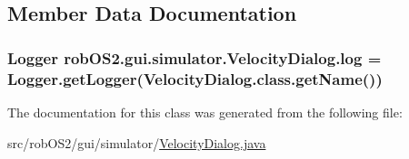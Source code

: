 \subsection{Member Data Documentation}
\hypertarget{classrob_o_s2_1_1gui_1_1simulator_1_1_velocity_dialog_ad96ed4d3960dc2b25370a9d4f284c660}{
\subsubsection[{log}]{\setlength{\rightskip}{0pt plus 5cm}Logger {\bf robOS2.gui.simulator.VelocityDialog.log} = Logger.getLogger(VelocityDialog.class.getName())}}
\label{classrob_o_s2_1_1gui_1_1simulator_1_1_velocity_dialog_ad96ed4d3960dc2b25370a9d4f284c660}


The documentation for this class was generated from the following file:\begin{DoxyCompactItemize}
\item 
src/robOS2/gui/simulator/\hyperlink{_velocity_dialog_8java}{VelocityDialog.java}\end{DoxyCompactItemize}
